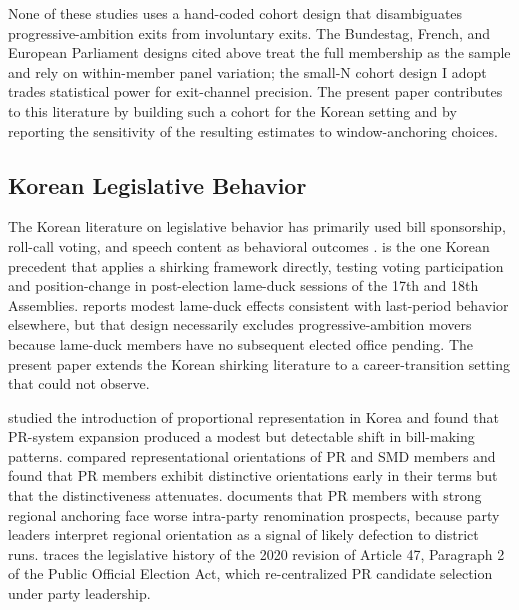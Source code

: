 \documentclass[11pt]{article}
\begin{document}
None of these studies uses a hand-coded cohort design that disambiguates progressive-ambition exits from involuntary exits. The Bundestag, French, and European Parliament designs cited above treat the full membership as the sample and rely on within-member panel variation; the small-N cohort design I adopt trades statistical power for exit-channel precision. The present paper contributes to this literature by building such a cohort for the Korean setting and by reporting the sensitivity of the resulting estimates to window-anchoring choices.

\subsection{Korean Legislative Behavior}

The Korean literature on legislative behavior has primarily used bill sponsorship, roll-call voting, and speech content as behavioral outcomes \citep{songlee2021, kimkwakkim2022, kimha2024, ka2025}. \citet{koo2018} is the one Korean precedent that applies a shirking framework directly, testing voting participation and position-change in post-election lame-duck sessions of the 17th and 18th Assemblies. \citet{koo2018} reports modest lame-duck effects consistent with last-period behavior elsewhere, but that design necessarily excludes progressive-ambition movers because lame-duck members have no subsequent elected office pending. The present paper extends the Korean shirking literature to a career-transition setting that \citet{koo2018} could not observe.

\citet{songlee2021} studied the introduction of proportional representation in Korea and found that PR-system expansion produced a modest but detectable shift in bill-making patterns. \citet{kimkwakkim2022} compared representational orientations of PR and SMD members and found that PR members exhibit distinctive orientations early in their terms but that the distinctiveness attenuates. \citet{im2025} documents that PR members with strong regional anchoring face worse intra-party renomination prospects, because party leaders interpret regional orientation as a signal of likely defection to district runs. \citet{yoon2023} traces the legislative history of the 2020 revision of Article 47, Paragraph 2 of the Public Official Election Act, which re-centralized PR candidate selection under party leadership.
\end{document}
